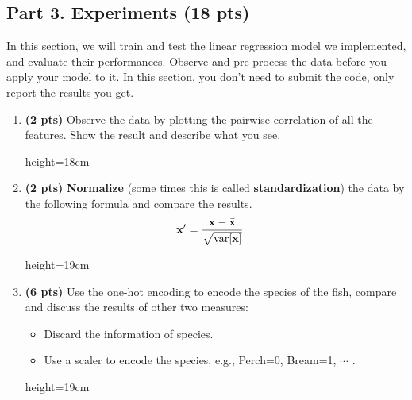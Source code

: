 
\pagebreak
\subsection*{Part 3. Experiments (18 pts)}
In this section, we will train and test the linear regression model we implemented, and evaluate their performances. 
Observe and pre-process the data before you apply your model to it. In this section, you don't need to submit the code, only report the results you get. 

\begin{enumerate}
    \item \textbf{(2 pts)} Observe the data by plotting the pairwise correlation of all the features. Show the result and describe what you see.
    \begin{soln}{height=18cm}
    \end{soln}
    \clearpage
    \item \textbf{(2 pts)} \textbf{Normalize} (some times this is called \textbf{standardization}) the data by the following formula and compare the results. 
    \begin{align*}
        {\mathbf{x}}^\prime &= \frac{{\mathbf{x}} - \bar{{\mathbf{x}}}}{\sqrt{\text{var}[{\mathbf{x}}]}}
    \end{align*}
    \begin{soln}{height=19cm}
    \end{soln}
    \clearpage
    \item \textbf{(6 pts)} Use the one-hot encoding to encode the species of the fish, compare and discuss the results of other two measures:
    \begin{itemize}
        \item Discard the information of species.
        \item Use a scaler to encode the species, e.g., Perch=0, Bream=1, $\cdots$ .
    \end{itemize}
    \begin{soln}{height=19cm}

\end{soln}
\end{enumerate}
